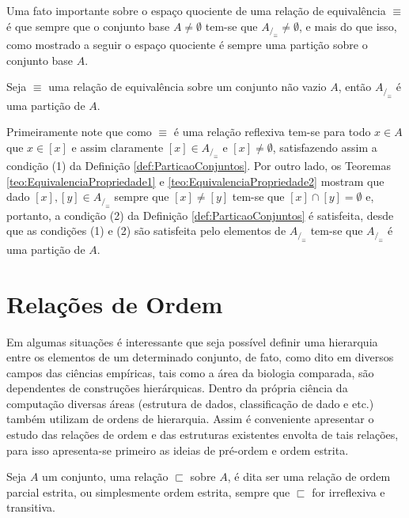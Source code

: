 Uma fato importante sobre o espaço quociente de uma relação de equivalência $\equiv$ é que sempre que o conjunto base $A \neq \emptyset$ tem-se que $A_{/_\equiv} \neq \emptyset$, e mais do que isso, como mostrado a seguir o espaço quociente é sempre uma partição sobre o conjunto base $A$.

\begin{teorema}
	Seja $\equiv$ uma relação de equivalência sobre um conjunto não vazio $A$, então $A_{/_\equiv}$ é uma partição de $A$.
\end{teorema}

\begin{prova}
	Primeiramente note que como $\equiv$ é uma relação reflexiva tem-se para todo $x \in A$ que $x \in [x]$ e assim claramente $[x] \in A_{/_\equiv}$ e $[x] \neq \emptyset$, satisfazendo assim a condição (1) da Definição \ref{def:ParticaoConjuntos}. Por outro lado, os Teoremas \ref{teo:EquivalenciaPropriedade1} e \ref{teo:EquivalenciaPropriedade2} mostram que dado $[x], [y] \in A_{/_\equiv}$ sempre que $[x] \neq [y]$ tem-se que  $[x] \cap [y] = \emptyset$ e, portanto, a condição (2) da Definição \ref{def:ParticaoConjuntos} é satisfeita, desde que as condições (1) e (2) são satisfeita pelo elementos de $A_{/_\equiv}$ tem-se que $A_{/_\equiv}$ é uma partição de $A$.
\end{prova}

\section{Relações de Ordem}\label{sec:Order}

Em algumas situações é interessante que seja possível definir uma hierarquia entre os elementos de um determinado conjunto, de fato, como dito em \cite{abe1991-TC} diversos campos das ciências empíricas, tais como a área da biologia comparada, são dependentes de construções hierárquicas. Dentro da própria ciência da computação diversas áreas (estrutura de dados, classificação de dado e etc.) também utilizam de ordens de hierarquia. Assim é conveniente apresentar o estudo das relações de ordem e das estruturas existentes envolta de tais relações, para isso apresenta-se primeiro as ideias de pré-ordem e ordem estrita.

\begin{definicao}\label{def:OrdemParcialEstrita}
	Seja $A$ um conjunto, uma relação $\sqsubset$ sobre $A$, é dita ser uma relação de ordem parcial estrita, ou simplesmente ordem estrita, sempre que $\sqsubset$ for irreflexiva e transitiva.
\end{definicao}

